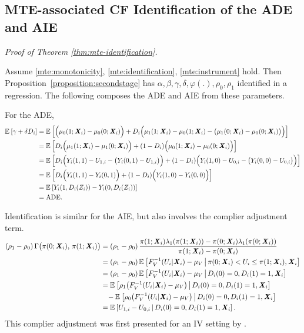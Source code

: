 \subsection{MTE-associated CF Identification of the ADE and AIE}
\label{appendix:mte-ade-aie}
\textit{Proof of Theorem \ref{thm:mte-identification}.}

Assume \ref{mte:monotonicity}, \ref{mte:identification}, \ref{mte:instrument} hold.
Then Proposition~\ref{proposition:secondstage} has $\alpha, \beta, \gamma, \delta, \varphi(.), \rho_0, \rho_1$ identified in a regression.
The following composes the ADE and AIE from these parameters.

For the ADE,
\begin{align*}
    \mathbb{E}_{} \left[  \gamma + \delta D_i \right]
        &= \mathbb{E}_{} \left[  \Big( \mu_0(1; \boldsymbol{\mathit{X}}_i) - \mu_0(0; \boldsymbol{\mathit{X}}_i) \Big)
            + D_i \Big( \mu_1(1; \boldsymbol{\mathit{X}}_i) - \mu_0(1; \boldsymbol{\mathit{X}}_i) - \big( \mu_1(0; \boldsymbol{\mathit{X}}_i) - \mu_0(0; \boldsymbol{\mathit{X}}_i) \big) \Big)  \right] \\
    &= \mathbb{E}_{} \left[  D_i \Big(\mu_1(1; \boldsymbol{\mathit{X}}_i) - \mu_1(0; \boldsymbol{\mathit{X}}_i) \Big)
        + (1 - D_i) \Big( \mu_0(1; \boldsymbol{\mathit{X}}_i) - \mu_0(0; \boldsymbol{\mathit{X}}_i) \Big)  \right] \\
    &= \mathbb{E}_{} \left[  D_i \Big( Y_i(1,1) - U_{1,i} - \big( Y_i(0,1) - U_{1,i} \big) \Big)
        + (1 - D_i) \Big( 
            Y_i(1,0) - U_{0,i} - \big( Y_i(0,0) - U_{0,i} \big) \Big)  \right] \\
    &= \mathbb{E}_{} \left[  D_i \Big( Y_i(1,1) - Y_i(0,1) \Big)
        + (1 - D_i) \Big( Y_i(1,0) - Y_i(0,0) \Big)  \right] \\
    &= \mathbb{E}_{} \left[  Y_i(1, D_i(Z_i)) - Y_i(0, D_i(Z_i)) \right] \\
    &= \text{ADE}.
\end{align*}

Identification is similar for the AIE, but also involves the complier adjustment term.
\begin{align*}
    (\rho_1 - \rho_0) \, \Gamma \big(\pi(0; \boldsymbol{\mathit{X}}_i), \, \pi(1; \boldsymbol{\mathit{X}}_i) \big)
    &= (\rho_1 - \rho_0) \, \frac{\pi(1; \boldsymbol{\mathit{X}}_i)\lambda_1(\pi(1; \boldsymbol{\mathit{X}}_i)) - \pi(0; \boldsymbol{\mathit{X}}_i)\lambda_1(\pi(0; \boldsymbol{\mathit{X}}_i))}{\pi(1; \boldsymbol{\mathit{X}}_i) - \pi(0; \boldsymbol{\mathit{X}}_i)} \\
    &= (\rho_1 - \rho_0) \, \mathbb{E}_{} \left[  F_V^{-1}(U_i | \boldsymbol{\mathit{X}}_i) - \mu_V  \, \middle\vert \, \pi(0; \boldsymbol{\mathit{X}}_i) < U_i \leq \pi(1; \boldsymbol{\mathit{X}}_i), \boldsymbol{\mathit{X}}_i \right] \\
    &= (\rho_1 - \rho_0) \, \mathbb{E}_{} \left[  F_V^{-1}(U_i | \boldsymbol{\mathit{X}}_i) - \mu_V  \, \middle\vert \, 
        D_i(0) = 0, D_i(1) = 1, \boldsymbol{\mathit{X}}_i \right] \\
    &= \mathbb{E}_{} \left[  \rho_1 \big( F_V^{-1}(U_i | \boldsymbol{\mathit{X}}_i) - \mu_V \big)  \, \middle\vert \, 
        D_i(0) = 0, D_i(1) = 1, \boldsymbol{\mathit{X}}_i \right] \\
    &\;\;\; - \mathbb{E}_{} \left[  \rho_0 \big( F_V^{-1}(U_i | \boldsymbol{\mathit{X}}_i) - \mu_V \big)  \, \middle\vert \, 
        D_i(0) = 0, D_i(1) = 1, \boldsymbol{\mathit{X}}_i \right] \\
    &= \mathbb{E}_{} \left[  U_{1,i} - U_{0,i}  \, \middle\vert \, D_i(0) = 0, D_i(1) = 1, \boldsymbol{\mathit{X}}_i \right].
\end{align*}
This complier adjustment was first presented for an IV setting by \cite{kline2019heckits}.

